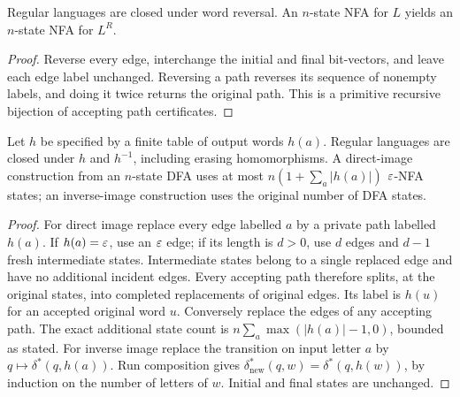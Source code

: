 \begin{theorem}[Reversal]\label{reg:reverse}
Regular languages are closed under word reversal.  An $n$-state NFA for
$L$ yields an $n$-state NFA for $L^R$.
\end{theorem}
\begin{proof}
Reverse every edge, interchange the initial and final bit-vectors, and
leave each edge label unchanged.  Reversing a path reverses its sequence
of nonempty labels, and doing it twice returns the original path.
This is a primitive recursive bijection of accepting path certificates.
\end{proof}

\begin{theorem}\label{reg:morphism}
Let $h$ be specified by a finite table of output words $h(a)$.  Regular
languages are closed under $h$ and $h^{-1}$, including erasing
homomorphisms.  A direct-image construction from an $n$-state DFA uses at
most $n(1+\sum_a|h(a)|)$ $\varepsilon$-NFA states; an inverse-image construction
uses the original number of DFA states.
\end{theorem}
\begin{proof}
For direct image replace every edge labelled $a$ by a private path labelled
$h(a)$.  If $h(a)=\varepsilon$, use an $\varepsilon$ edge; if its length is $d>0$, use
$d$ edges and $d-1$ fresh intermediate states.  Intermediate states belong
to a single replaced edge and have no additional incident edges.  Every
accepting path therefore splits, at the original states, into completed
replacements of original edges.  Its label is $h(u)$ for an accepted
original word $u$.  Conversely replace the edges of any accepting path.
The exact additional state count is
$n\sum_a\max(|h(a)|-1,0)$, bounded as stated.
For inverse image replace the transition on input letter $a$ by
$q\mapsto\delta^*(q,h(a))$.  Run composition gives
$\delta_{\mathrm{new}}^*(q,w)=\delta^*(q,h(w))$, by induction on the
number of letters of $w$.  Initial and final states are unchanged.
\end{proof}

